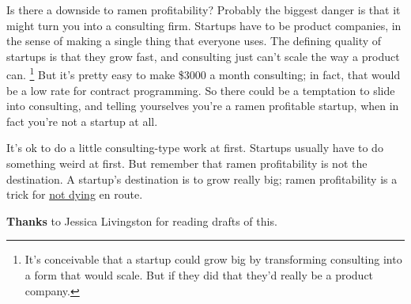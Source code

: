 Is there a downside to ramen profitability? Probably the biggest danger
is that it might turn you into a consulting firm. Startups have to be
product companies, in the sense of making a single thing that everyone
uses. The defining quality of startups is that they grow fast, and
consulting just can't scale the way a product can.
\footnote{It's conceivable that a startup could grow big by transforming
consulting into a form that would scale. But if they did that they'd
really be a product company.} But it's pretty easy to make \$3000 a month
consulting; in fact, that would be a low rate for contract programming.
So there could be a temptation to slide into consulting, and telling
yourselves you're a ramen profitable startup, when in fact you're not a
startup at all.

It's ok to do a little consulting-type work at first. Startups usually
have to do something weird at first. But remember that ramen
profitability is not the destination. A startup's destination is to grow
really big; ramen profitability is a trick for \href{die.html}{not
dying} en route.


\textbf{Thanks} to Jessica Livingston for reading drafts of this.
